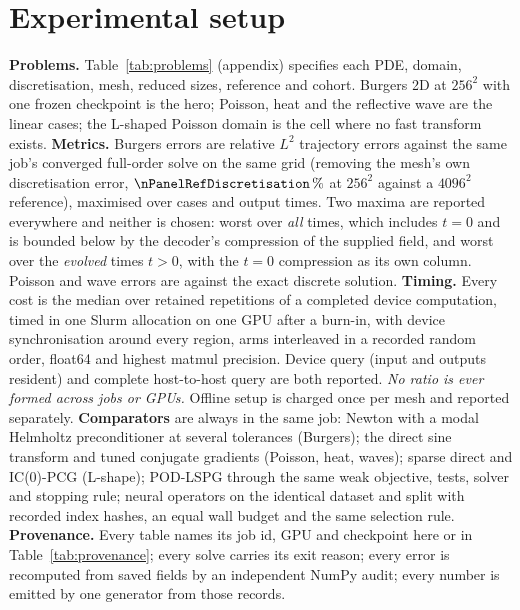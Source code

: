 \section{Experimental setup}
\label{sec:setup}

\textbf{Problems.} Table~\ref{tab:problems} (appendix) specifies each PDE,
domain, discretisation, mesh, reduced sizes, reference and cohort. Burgers 2D
at $256^2$ with one frozen checkpoint is the hero; Poisson, heat and the
reflective wave are the linear cases; the L-shaped Poisson domain is the cell
where no fast transform exists.
\textbf{Metrics.} Burgers errors are relative $L^2$ trajectory errors against
the same job's converged full-order solve on the same grid (removing the
mesh's own discretisation error, $\nPanelRefDiscretisation\,\%$ at $256^2$
against a $4096^2$ reference), maximised over cases and output times. Two
maxima are reported everywhere and neither is chosen: worst over \emph{all}
times, which includes $t=0$ and is bounded below by the decoder's compression
of the supplied field, and worst over the \emph{evolved} times $t>0$, with the
$t=0$ compression as its own column. Poisson and wave errors are against the
exact discrete solution.
\textbf{Timing.} Every cost is the median over retained repetitions of a
completed device computation, timed in one Slurm allocation on one GPU after a
burn-in, with device synchronisation around every region, arms interleaved in a
recorded random order, float64 and highest matmul precision. Device query
(input and outputs resident) and complete host-to-host query are both reported.
\emph{No ratio is ever formed across jobs or GPUs.} Offline setup is charged
once per mesh and reported separately.
\textbf{Comparators} are always in the same job: Newton with a modal Helmholtz
preconditioner at several tolerances (Burgers); the direct sine transform and
tuned conjugate gradients (Poisson, heat, waves); sparse direct and IC(0)-PCG
(L-shape); POD-LSPG through the same weak objective, tests, solver and stopping
rule; neural operators on the identical dataset and split with recorded index
hashes, an equal wall budget and the same selection rule.
\textbf{Provenance.} Every table names its job id, GPU and checkpoint here or
in Table~\ref{tab:provenance}; every solve carries its exit reason; every error
is recomputed from saved fields by an independent NumPy audit; every number is
emitted by one generator from those records.
